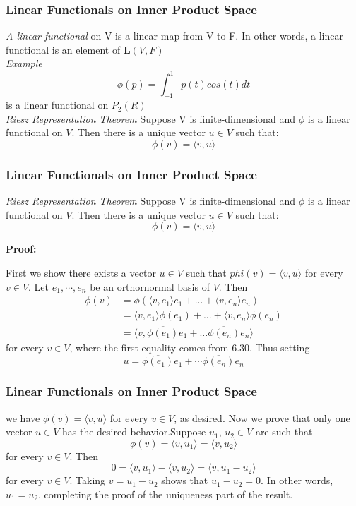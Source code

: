 \documentclass[12pt, t]{beamer}
\renewcommand{\emph}[1]{{\color{Turquoise3}\textsl{#1}}}
\newcommand{\nullspace}{~\\[15pt]}
\begin{document}
\begin{frame}
    \frametitle{Linear Functionals on Inner Product Space}
    \emph{A linear functional} on V is a linear map from V to F. In other words, a linear functional is an element of $\mathbf{L}(V,F)$
    \nullspace
    \emph{Example} $$\phi(p)=\int_{-1}^{1} p(t)cos(t) dt$$ is a linear functional on $P_2(R)$
    \nullspace
    \emph{Riesz Representation Theorem} Suppose V is finite-dimensional and $\phi$ is a linear functional on $V$. Then there is a unique vector $u\in V$ such that:
    $$\phi (v)= \langle v,u \rangle $$
\end{frame}

\begin{frame}
    \frametitle{Linear Functionals on Inner Product Space}
    \emph{Riesz Representation Theorem} Suppose V is finite-dimensional and $\phi$ is a linear functional on $V$. Then there is a unique vector $u\in V$ such that:
    $$\phi (v)= \langle v,u \rangle $$

    \textbf{Proof:} 
    
    First we show there exists a vector $u \in V$ such that $phi (v)=\langle v,u \rangle $ for every $v \in V$. Let $e_1,\cdots,e_n$ be an orthornormal basis of $V$. Then
    \begin{equation*}
        \begin{aligned}
            \phi(v)&=\phi (\langle v, e_1\rangle  e_1+...+\langle v, e_n \rangle e_n)\\
                  &=\langle v, e_1\rangle \phi (e_1)+...+\langle v, e_n \rangle \phi (e_n)\\
                  &= \langle v, \overline{\phi (e_1)}e_1+...\overline{\phi (e_n)}e_n \rangle
        \end{aligned}
    \end{equation*}
    for every $v \in V$, where the first equality comes from 6.30. Thus setting
    \begin{equation}
        u=\overline{\phi (e_1)}e_1+\cdots \overline{\phi (e_n)}e_n 
    \end{equation}
  

    
\end{frame}
\begin{frame}
        \frametitle{Linear Functionals on Inner Product Space}
    we have $\phi (v)=\langle v, u \rangle $ for every $v \in V$, as desired.
    Now we prove that only one vector $u \in V$ has the desired behavior.Suppose $u_1$, $u_2\in V$ are such that
    \[
        \phi (v) =\langle v, u_1 \rangle =\langle v, u_2 \rangle
   \]
    for every $v \in V$. Then
    $$
    0=\langle v,u_1 \rangle -\langle v, u_2 \rangle =\langle v, u_1-u_2\rangle
    $$
    for every $v \in V$. Taking $v=u_1-u_2$ shows that $u_1-u_2 =0$. In other words, $u_1=u_2$, completing the proof of the uniqueness part of the result. 
    
\end{frame}
\end{document}
